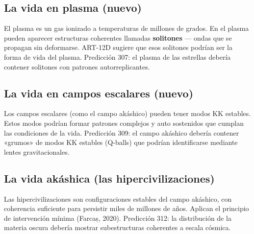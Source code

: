 \subsection{La vida en plasma (nuevo)}
El plasma es un gas ionizado a temperaturas de millones de grados. En el plasma pueden aparecer estructuras coherentes llamadas \textbf{solitones} --- ondas que se propagan sin deformarse. ART-12D sugiere que esos solitones podrían ser la forma de vida del plasma. Predicción 307: el plasma de las estrellas debería contener solitones con patrones autorreplicantes.

\subsection{La vida en campos escalares (nuevo)}
Los campos escalares (como el campo akáshico) pueden tener modos KK estables. Estos modos podrían formar patrones complejos y auto sostenidos que cumplan las condiciones de la vida. Predicción 309: el campo akáshico debería contener «grumos» de modos KK estables (Q-balls) que podrían identificarse mediante lentes gravitacionales.

\subsection{La vida akáshica (las hipercivilizaciones)}
Las hipercivilizaciones son configuraciones estables del campo akáshico, con coherencia suficiente para persistir miles de millones de años. Aplican el principio de intervención mínima (Farcaș, 2020). Predicción 312: la distribución de la materia oscura debería mostrar subestructuras coherentes a escala cósmica.

\newpage
